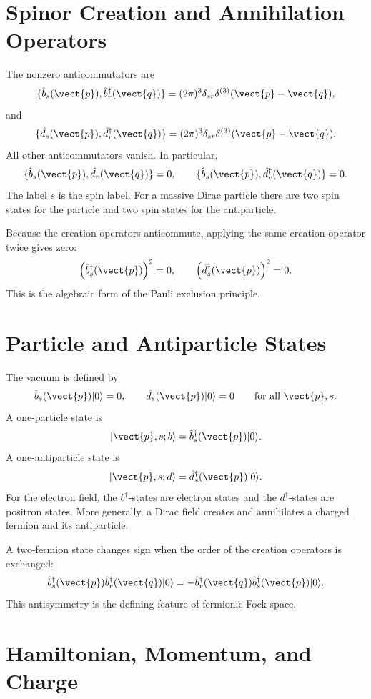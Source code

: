 \section{Spinor Creation and Annihilation Operators}

The nonzero anticommutators are
\[
    \{\hat b_s(\vect{p}),\hat b_r^\dagger(\vect{q})\}
    = (2\pi)^3\delta_{sr}\delta^{(3)}(\vect{p}-\vect{q}),
\]
and
\[
    \{\hat d_s(\vect{p}),\hat d_r^\dagger(\vect{q})\}
    = (2\pi)^3\delta_{sr}\delta^{(3)}(\vect{p}-\vect{q}).
\]
All other anticommutators vanish. In particular,
\[
    \{\hat b_s(\vect{p}),\hat d_r(\vect{q})\}=0,
    \qquad
    \{\hat b_s(\vect{p}),\hat d_r^\dagger(\vect{q})\}=0.
\]
The label \(s\) is the spin label. For a massive Dirac particle there are two
spin states for the particle and two spin states for the antiparticle.

Because the creation operators anticommute, applying the same creation operator
twice gives zero:
\[
    \left(\hat b_s^\dagger(\vect{p})\right)^2=0,
    \qquad
    \left(\hat d_s^\dagger(\vect{p})\right)^2=0.
\]
This is the algebraic form of the Pauli exclusion principle.

\section{Particle and Antiparticle States}

The vacuum is defined by
\[
    \hat b_s(\vect{p})|0\rangle=0,
    \qquad
    \hat d_s(\vect{p})|0\rangle=0
    \qquad \text{for all }\vect{p},s.
\]
A one-particle state is
\[
    |\vect{p},s;b\rangle
    = \hat b_s^\dagger(\vect{p})|0\rangle.
\]
A one-antiparticle state is
\[
    |\vect{p},s;d\rangle
    = \hat d_s^\dagger(\vect{p})|0\rangle.
\]
For the electron field, the \(b^\dagger\)-states are electron states and the
\(d^\dagger\)-states are positron states. More generally, a Dirac field creates
and annihilates a charged fermion and its antiparticle.

A two-fermion state changes sign when the order of the creation operators is
exchanged:
\[
    \hat b_s^\dagger(\vect{p})\hat b_r^\dagger(\vect{q})|0\rangle
    = -\hat b_r^\dagger(\vect{q})\hat b_s^\dagger(\vect{p})|0\rangle.
\]
This antisymmetry is the defining feature of fermionic Fock space.

\section{Hamiltonian, Momentum, and Charge}


